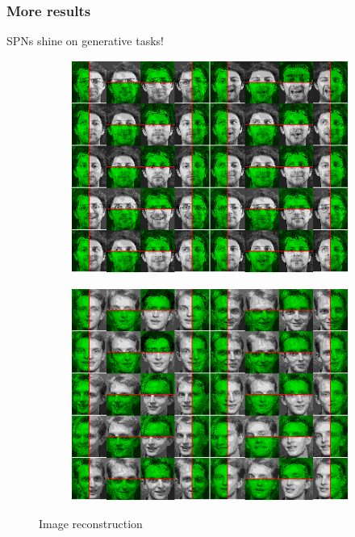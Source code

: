 \documentclass[pdf]{beamer}
\begin{document}
\begin{frame}
  \frametitle{More results}

  SPNs shine on generative tasks!

  \begin{figure}
    \begin{subfigure}{0.49\textwidth}
      \centering\includegraphics[width=\textwidth]{cmpl_0.png}
    \end{subfigure}
    \begin{subfigure}{0.49\textwidth}
      \centering\includegraphics[width=\textwidth]{cmpl_1.png}
    \end{subfigure}
    \caption{Image reconstruction}
  \end{figure}
\end{frame}
\end{document}
